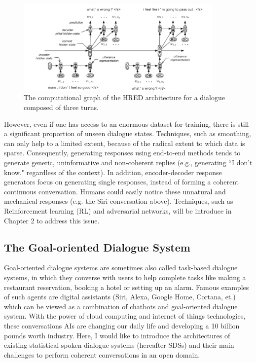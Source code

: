 \documentclass[bsc,frontabs,twoside,singlespacing,parskip,deptreport]{infthesis}     %
\begin{document}
\begin{figure}[h]
    \centering
    \includegraphics[width=0.9\textwidth]{HERD.jpeg}
    \caption{The computational graph of the HRED architecture for a dialogue composed of three turns.}
    \label{fig:HERD}
\end{figure}

However, even if one has access to an enormous dataset for training, there is still a significant proportion of unseen dialogue states. Techniques, such as smoothing, can only help to a limited extent, because of the radical extent to which data is sparse. Consequently, generating responses using end-to-end methods tends to generate generic, uninformative and non-coherent replies (e.g., generating ``I don’t know." regardless of the context). In addition, encoder-decoder response generators focus on generating single responses, instead of forming a coherent continuous conversation\cite{jurafsky2019speech}. Humans could easily notice these unnatural and mechanical responses (e.g. the Siri conversation above). Techniques, such as Reinforcement learning (RL) and adversarial networks, will be introduce in Chapter 2 to address this issue\cite{li2017adversarial,li2016deep}.

\subsection{The Goal-oriented Dialogue System}

 Goal-oriented dialogue systems are sometimes also called task-based dialogue systems, in which they converse with users to help complete tasks like making a restaurant reservation, booking a hotel or setting up an alarm. Famous examples of such agents are digital assistants (Siri, Alexa, Google Home, Cortana, et.) which can be viewed as a combination of chatbots and goal-oriented dialogue system. With the power of cloud computing and internet of things technologies, these conversations AIs are changing our daily life and developing a 10 billion pounds worth industry. Here, I would like to introduce the architectures of existing statistical spoken dialogue systems (hereafter SDSs) and their main challenges to perform coherent conversations in an open domain. 
\end{document}
